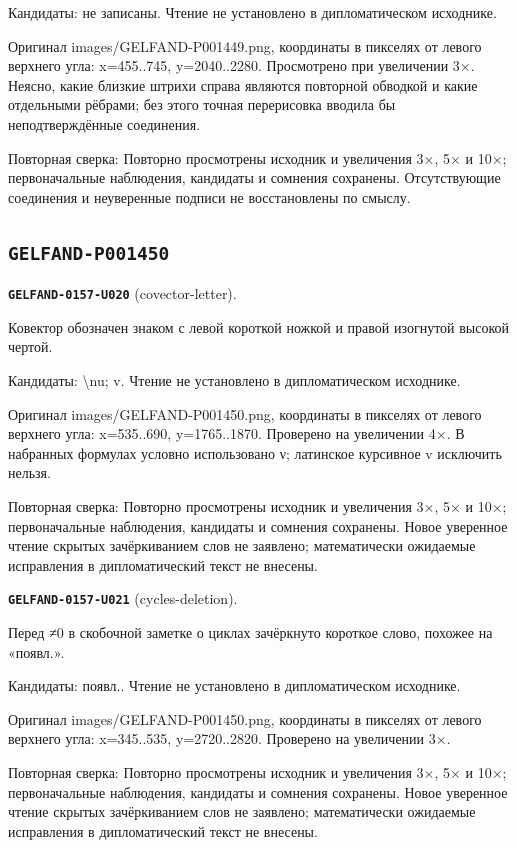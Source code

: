 Кандидаты: не записаны. Чтение не установлено в дипломатическом исходнике.\par
Оригинал images/GELFAND-P001449.png, координаты в пикселях от левого верхнего угла: x=455..745, y=2040..2280. Просмотрено при увеличении 3×. Неясно, какие близкие штрихи справа являются повторной обводкой и какие отдельными рёбрами; без этого точная перерисовка вводила бы неподтверждённые соединения.\par
Повторная сверка: Повторно просмотрены исходник и увеличения 3×, 5× и 10×; первоначальные наблюдения, кандидаты и сомнения сохранены. Отсутствующие соединения и неуверенные подписи не восстановлены по смыслу.\par\medskip
\subsection*{\texttt{GELFAND-P001450}}
\par\noindent\leavevmode{}\label{GELFAND-0157-U020}\label{GELFAND-P001450:covector-letter}\textbf{\texttt{GELFAND-0157-U020}} (covector-letter).\nopagebreak[4]\par
Ковектор обозначен знаком с левой короткой ножкой и правой изогнутой высокой чертой.\par
Кандидаты: \textbackslash{}nu; v. Чтение не установлено в дипломатическом исходнике.\par
Оригинал images/GELFAND-P001450.png, координаты в пикселях от левого верхнего угла: x=535..690, y=1765..1870. Проверено на увеличении 4×. В набранных формулах условно использовано ν; латинское курсивное v исключить нельзя.\par
Повторная сверка: Повторно просмотрены исходник и увеличения 3×, 5× и 10×; первоначальные наблюдения, кандидаты и сомнения сохранены. Новое уверенное чтение скрытых зачёркиванием слов не заявлено; математически ожидаемые исправления в дипломатический текст не внесены.\par\medskip
\par\noindent\leavevmode{}\label{GELFAND-0157-U021}\label{GELFAND-P001450:cycles-deletion}\textbf{\texttt{GELFAND-0157-U021}} (cycles-deletion).\nopagebreak[4]\par
Перед ≠0 в скобочной заметке о циклах зачёркнуто короткое слово, похожее на «появл.».\par
Кандидаты: появл.. Чтение не установлено в дипломатическом исходнике.\par
Оригинал images/GELFAND-P001450.png, координаты в пикселях от левого верхнего угла: x=345..535, y=2720..2820. Проверено на увеличении 3×.\par
Повторная сверка: Повторно просмотрены исходник и увеличения 3×, 5× и 10×; первоначальные наблюдения, кандидаты и сомнения сохранены. Новое уверенное чтение скрытых зачёркиванием слов не заявлено; математически ожидаемые исправления в дипломатический текст не внесены.\par\medskip
